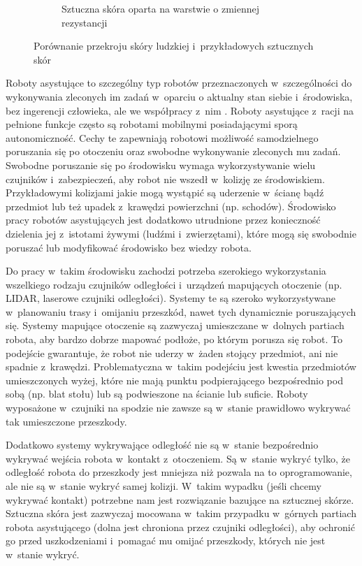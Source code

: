 \begin{figure}[!h]
\begin{subfigure}[t]{0.33\linewidth}
    \caption{Sztuczna skóra oparta na warstwie o zmiennej rezystancji \cite{b_konf_gietka_przekroj}} 
  \end{subfigure}
  
  \centering
  \caption{Porównanie przekroju skóry ludzkiej i~przykładowych sztucznych skór}
  \label{f_porownanie_skory}
\end{figure}

Roboty asystujące to szczególny typ robotów przeznaczonych w~szczególności do wykonywania zleconych im zadań w~oparciu o aktualny stan siebie i~środowiska, bez ingerencji człowieka, ale we współpracy z~nim \cite{b_site_robot_definition}. Roboty asystujące z~racji na pełnione funkcje często są robotami mobilnymi posiadającymi sporą autonomiczność. Cechy te zapewniają robotowi możliwość samodzielnego poruszania się po otoczeniu oraz swobodne wykonywanie zleconych mu zadań. Swobodne poruszanie się po środowisku wymaga wykorzystywanie wielu czujników i~zabezpieczeń, aby robot nie wszedł w~kolizję ze środowiskiem. Przykładowymi kolizjami jakie mogą wystąpić są uderzenie w~ścianę bądź przedmiot lub też upadek z~krawędzi powierzchni (np. schodów). Środowisko pracy robotów asystujących jest dodatkowo utrudnione przez konieczność dzielenia jej z~istotami żywymi (ludźmi i~zwierzętami), które mogą się swobodnie poruszać lub modyfikować środowisko bez wiedzy robota.

Do pracy w~takim środowisku zachodzi potrzeba szerokiego wykorzystania wszelkiego rodzaju czujników odległości i~urządzeń mapujących otoczenie (np. LIDAR, laserowe czujniki odległości). Systemy te są szeroko wykorzystywane w~planowaniu trasy i~omijaniu przeszkód, nawet tych dynamicznie poruszających się. Systemy mapujące otoczenie są zazwyczaj umieszczane w~dolnych partiach robota, aby bardzo dobrze mapować podłoże, po którym porusza się robot. To podejście gwarantuje, że robot nie uderzy w~żaden stojący przedmiot, ani nie spadnie z~krawędzi. Problematyczna w~takim podejściu jest kwestia przedmiotów umieszczonych wyżej, które nie mają punktu podpierającego bezpośrednio pod sobą (np. blat stołu) lub są podwieszone na ścianie lub suficie. Roboty wyposażone w~czujniki na spodzie nie zawsze są w~stanie prawidłowo wykrywać tak umieszczone przeszkody.

Dodatkowo systemy wykrywające odległość nie są w~stanie bezpośrednio wykrywać wejścia robota w~kontakt z~otoczeniem. Są w~stanie wykryć tylko, że odległość robota do przeszkody jest mniejsza niż pozwala na to oprogramowanie, ale nie są w~stanie wykryć samej kolizji. W~takim wypadku (jeśli chcemy wykrywać kontakt) potrzebne nam jest rozwiązanie bazujące na sztucznej skórze. Sztuczna skóra jest zazwyczaj mocowana w~takim przypadku w~górnych partiach robota asystującego (dolna jest chroniona przez czujniki odległości), aby ochronić go przed uszkodzeniami i~pomagać mu omijać przeszkody, których nie jest w~stanie wykryć.

